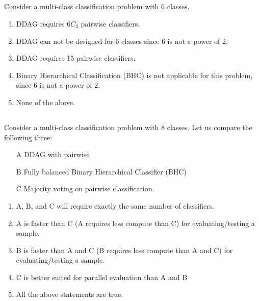\begin{frame}
\section{}
Consider a multi-class classification problem with 6 classes.
\begin{enumerate}[label=(\Alph*)]
\item DDAG requires $6C_2$ pairwise classifiers.    %
\item DDAG can not be designed for 6 classes since $6$ is not a power of 2.
\item DDAG requires 15 pairwise classifiers.    %
\item Binary Hierarchical Classification  (BHC) is not applicable for this problem, since $6$ is not a power of $2$.
\item None of the above.  %
\end{enumerate}
\end{frame}

\begin{frame}
\section{}
Consider a multi-class classification problem with 8 classes.
Let us compare the following three:
\begin{itemize}
   \item [A] DDAG with pairwise
   \item [B] Fully balanced Binary Hierarchical Classifier (BHC)
   \item [C] Majority voting on pairwise classification.
\end{itemize}

\begin{enumerate}[label=(\Alph*)]
\item A, B, and C will require exactly the same number of classifiers.
\item A is faster than C (A requires less compute than C) for evaluating/testing a sample.    %
\item B is faster than A and C (B requires less compute than A and C) for evaluating/testing a sample.    %
\item C is better suited for parallel evaluation than A and B   %
\item All the above statements are true.  %
\end{enumerate}
\end{frame}

